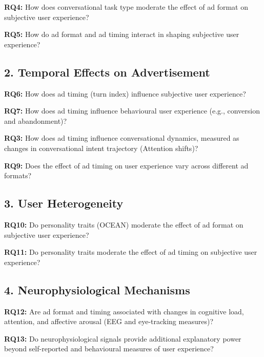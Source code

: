 \documentclass{article}
\begin{document}
\textbf{RQ4:} How does conversational task type moderate the effect of ad format on subjective user experience?

\textbf{RQ5:} How do ad format and ad timing interact in shaping subjective user experience?

\subsection{2. Temporal Effects on Advertisement}

\textbf{RQ6:} How does ad timing (turn index) influence subjective user experience?

\textbf{RQ7:} How does ad timing influence behavioural user experience (e.g., conversion and abandonment)?

\textbf{RQ3:} How does ad timing influence conversational dynamics, measured as changes in conversational intent trajectory (Attention shifts)?

\textbf{RQ9:} Does the effect of ad timing on user experience vary across different ad formats?

\subsection{3. User Heterogeneity}

\textbf{RQ10:} Do personality traits (OCEAN) moderate the effect of ad format on subjective user experience?

\textbf{RQ11:} Do personality traits moderate the effect of ad timing on subjective user experience?

\subsection{4. Neurophysiological Mechanisms}

\textbf{RQ12:} Are ad format and timing associated with changes in cognitive load, attention, and affective arousal (EEG and eye-tracking measures)?

\textbf{RQ13:} Do neurophysiological signals provide additional explanatory power beyond self-reported and behavioural measures of user experience?
\end{document}

